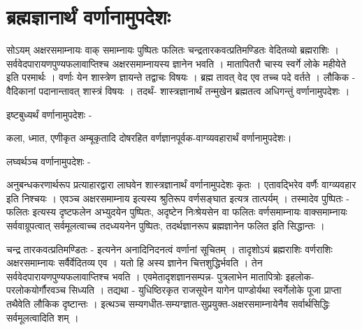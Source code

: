 {\section*{ब्रह्मज्ञानार्थं वर्णानामुपदेशः}	

सोऽयम् अक्षरसमाम्नायः वाक् समाम्नायः पुष्पितः फलितः चन्द्रतारकवत्प्रतिमण्डितः वेदितव्यो ब्रह्मराशिः । सर्ववेदपारायणपुण्यफलावाप्तिश्च अक्षरसमाम्नायस्य ज्ञानेन भवति । मातापितरौ चास्य स्वर्गे लोके महीयेते इति परमार्थः । वर्णाः येन शास्त्रेण ज्ञायन्ते तद्वाचः विषयः । ब्रह्म तावत् वेद एव तच्च पदे वर्तते । लौकिक - वैदिकानां पदानान्तावत्  शास्त्रं विषयः । तदर्थं- शास्त्रज्ञानार्थं तन्मुखेन ब्रह्मतत्व अधिगन्तुं वर्णानामुपदेशः ।	

इष्टबुध्यर्थं वर्णानामुपदेशः -

कला, ध्मात, एणीकृत अम्बूकृतादि दोषरहित वर्णज्ञानपूर्वक-वाग्व्यवहारार्थं वर्णानामुपदेशः।

लघ्वर्थञ्च वर्णानामुपदेशः -	

अनुबन्धकरणार्थरूप प्रत्याहारद्वारा लाघवेन शास्त्रज्ञानार्थं वर्णानामुपदेशः कृतः । एतावद्भिरेव वर्णैः वाग्व्यवहार इति निश्चयः । एवञ्च अक्षरसमाम्नाय इत्यस्य श्रुतिरूप वर्णसङ्घात इत्यत्र तात्पर्यम् । तस्मादेव पुष्पितः - फलितः इत्यस्य दृष्टफलेन अभ्युदयेन पुष्पितः, अदृष्टेन निःश्रेयसेन  वा फलितः वर्णसमाम्नायः वाक्समाम्नायः सर्ववाग्रूपत्वात् सर्वमूलत्वाच्च तदध्ययनेन पुष्पितः, तदर्थज्ञानरूप ब्रह्मज्ञानेन फलित इति सिद्धान्तः ।

चन्द्र तारकवत्प्रतिमण्डितः  - इत्यनेन अनादिनिदनत्वं वर्णानां सूचितम् । तादृशोऽयं ब्रह्मराशिः वर्णराशिः अक्षरसमाम्नायः सर्वैर्वेदितव्य एव । यतो हि अस्य ज्ञानेन चित्तशुद्धिर्भवति । तेन सर्ववेदपारायणपुण्यफलावाप्तिश्च भवति । एवमेतादृशज्ञानसम्पन्न- पुत्रलाभेन मातापित्रोः इहलोक-परलोकयोर्गौरवञ्च सिध्यति । तद्यथा - युधिष्ठिरकृत राजसूयेन यागेन पाण्डोर्यथा स्वर्गेलोके पूजा प्राप्ता तथैवेति लौकिक दृष्टान्तः । इत्थञ्च सम्यगधीत-सम्यग्ज्ञात-सुप्रयुक्त-अक्षरसमाम्नायेनैव सर्वार्थसिद्धिः सर्वमूलत्वादिति शम् ।

\articleend
}

